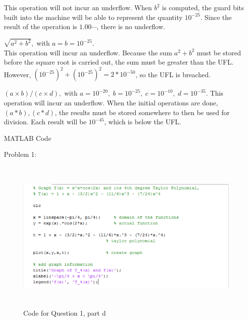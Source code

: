 	This operation will not incur an underflow. When $b^2$ is computed, the guard bits built into the machine will be able to represent
	the quantity $10^{-25}$. Since the result of the operation is $1.00\cdots$, there is no underflow. \\

\item $\sqrt{a^2+b^2},$ with $a=b=10^{-25}.$ \\
	This operation will incur an underflow. Because the sum $a^2 + b^2$ must be stored before the square root is carried out, the sum
	must be greater than the UFL. However, $(10^{-25})^2 + (10^{-25})^2 = 2*10^{-50}$, so the UFL is breached. \\

\item $(a\times b)/(c \times d),$ with $a=10^{-20}, \; b=10^{-25}, \; c=10^{-10}, \; d=10^{-35}.$
	This operation will incur an underflow. When the initial operations are done, $(a*b), (c*d)$, the results must be stored somewhere to
	then be used for division. Each result will be $10^{-45}$, which is below the UFL.
\eenum

\eenum

\eenum

\newpage

\bc MATLAB Code \ec

Problem 1:

	\begin{figure}[h!]
		\centering
		\includegraphics[width=6in, height=3in]{script1_1.PNG}
		\caption{Code for Question 1, part d}
		\label{fig:graph4}
	\end{figure}

